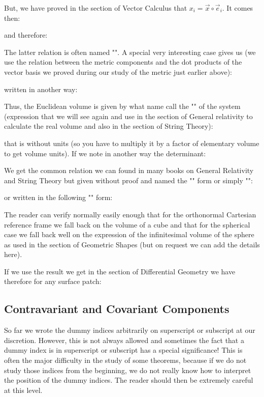 	But, we have proved in the section of Vector Calculus that $x_i=\vec{x}\circ\vec{e}_i$. It comes then:
	
	and therefore:
	
	The latter relation is often named "". A special very interesting case gives us (we use the relation between the metric components and the dot products of the vector basis we proved during our study of the metric just earlier above):
	
	written in another way:
	
	Thus, the Euclidean volume  is given by what name call the "" of the system (expression that we will see again and use in the section of General relativity to calculate the real volume and also in the section of String Theory):
		
	that is without units (so you have to multiply it by a factor of elementary volume to get volume units). If we note in another way the determinant:
		
	We get the common relation we can found in many books on General Relativity and String Theory but given without proof and named the "\label{Riemannian volume}" form or simply "":
		
	or written in the following "" form:
	
	The reader can verify normally easily enough that for the orthonormal Cartesian reference frame we fall back on the volume of a cube and that for the spherical case we fall back well on the expression of the infinitesimal volume of the sphere as used in the section of Geometric Shapes (but on request we can add the details here).
	
	If we use the result we get in the section of Differential Geometry we have therefore for any surface patch:
	

	
	\subsection{Contravariant and Covariant Components}\label{contravariant and covariant components}
	So far we wrote the dummy indices arbitrarily on superscript or subscript at our discretion. However, this is not always allowed and sometimes the fact that a dummy index is in superscript or subscript has a special significance! This is often the major difficulty in the study of some theorems, because if we do not study those indices from the beginning, we do not really know how to interpret the position of the dummy indices. The reader should then be extremely careful at this level.

